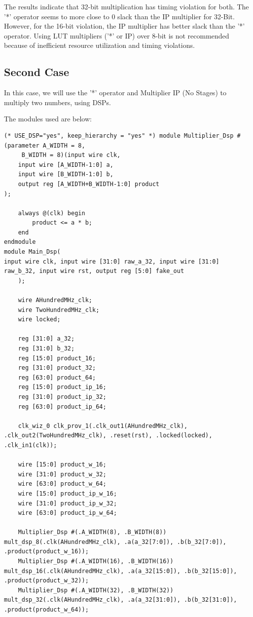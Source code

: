 \documentclass{report}
\begin{document}
The results indicate that 32-bit multiplication has timing violation for both. The '*' operator seems to more close to 0 slack than the IP multiplier for 32-Bit.
However, for the 16-bit violation, the IP multiplier has better slack than the '*' operator. Using LUT multipliers ('*' or IP) over 8-bit is not recommended because of inefficient resource utilization and timing violations.

\subsection{Second Case}
In this case, we will use the '*' operator and Multiplier IP (No Stages) to multiply two numbers, using DSPs.

The modules used are below:
\begin{verbatim}
(* USE_DSP="yes", keep_hierarchy = "yes" *) module Multiplier_Dsp #(parameter A_WIDTH = 8,
     B_WIDTH = 8)(input wire clk,
    input wire [A_WIDTH-1:0] a,
    input wire [B_WIDTH-1:0] b,
    output reg [A_WIDTH+B_WIDTH-1:0] product
);

    always @(clk) begin
        product <= a * b;
    end
endmodule
module Main_Dsp(
input wire clk, input wire [31:0] raw_a_32, input wire [31:0] raw_b_32, input wire rst, output reg [5:0] fake_out
    );

    wire AHundredMHz_clk;
    wire TwoHundredMHz_clk;
    wire locked;

    reg [31:0] a_32;
    reg [31:0] b_32;
    reg [15:0] product_16;
    reg [31:0] product_32;
    reg [63:0] product_64;
    reg [15:0] product_ip_16;
    reg [31:0] product_ip_32;
    reg [63:0] product_ip_64;

    clk_wiz_0 clk_prov_1(.clk_out1(AHundredMHz_clk), .clk_out2(TwoHundredMHz_clk), .reset(rst), .locked(locked), .clk_in1(clk));

    wire [15:0] product_w_16;
    wire [31:0] product_w_32;
    wire [63:0] product_w_64;    
    wire [15:0] product_ip_w_16;
    wire [31:0] product_ip_w_32;
    wire [63:0] product_ip_w_64;    

    Multiplier_Dsp #(.A_WIDTH(8), .B_WIDTH(8)) mult_dsp_8(.clk(AHundredMHz_clk), .a(a_32[7:0]), .b(b_32[7:0]), .product(product_w_16));
    Multiplier_Dsp #(.A_WIDTH(16), .B_WIDTH(16)) mult_dsp_16(.clk(AHundredMHz_clk), .a(a_32[15:0]), .b(b_32[15:0]), .product(product_w_32));
    Multiplier_Dsp #(.A_WIDTH(32), .B_WIDTH(32)) mult_dsp_32(.clk(AHundredMHz_clk), .a(a_32[31:0]), .b(b_32[31:0]), .product(product_w_64));


\end{verbatim}
\end{document}

